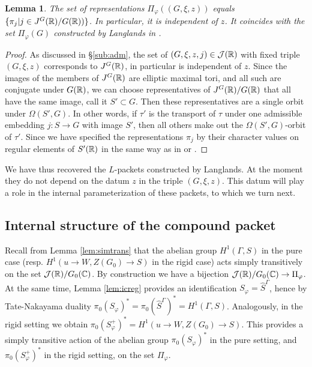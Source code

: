 \documentclass{article}
\newtheorem{lem}[thm]{Lemma}
\theoremstyle{definition}
\numberwithin{equation}{section}
\renewcommand{\-}{\hyp{}}
\begin{document}
\begin{lem}
The set of representations $\Pi_\varphi((G,\xi,z))$ equals $\{\pi_j|j \in J^G(\mathbb{R})/G(\mathbb{R}))\}$. In particular, it is independent of $z$. It coincides with the set $\Pi_\varphi(G)$ constructed by Langlands in \cite[\S3]{Lan89}.
\end{lem}
\begin{proof}
	As discussed in \S\ref{sub:adm}, the set of $(G,\xi,z,j) \in \mathcal{J}(\mathbb{R})$ with fixed triple $(G,\xi,z)$ corresponds to $J^G(\mathbb{R})$, in particular is independent of $z$. Since the images of the members of $J^G(\mathbb{R})$ are elliptic maximal tori, and all such are conjugate under $G(\mathbb{R})$, we can choose representatives of $J^G(\mathbb{R})/G(\mathbb{R})$ that all have the same image, call it $S' \subset G$. Then these representatives are a single orbit under $\Omega(S',G)$. In other words, if $\tau'$ is the transport of $\tau$ under one admissible embedding $j : S \to G$ with image $S'$, then all others make out the $\Omega(S',G)$-orbit of $\tau'$. Since we have specified the representations $\pi_j$ by their character values on regular elements of $S'(\mathbb{R})$ in the same way as in \cite[\S3]{Lan89} or \cite[\S4]{AV16}.
\end{proof}

We have thus recovered the $L$\-packets constructed by Langlands. At the moment they do not depend on the datum $z$ in the triple $(G,\xi,z)$. This datum will play a role in the internal parameterization of these packets, to which we turn next.

\subsection{Internal structure of the compound packet} \label{sub:intstr}


Recall from Lemma \ref{lem:simtrans} that the abelian group $H^1(\Gamma,S)$ in the pure case (resp. $H^1(u \to W,Z(G_0) \to S)$ in the rigid case) acts simply transitively on the set $\mathcal{J}(\mathbb{R})/G_0(\mathbb{C})$. By construction we have a bijection $\mathcal{J}(\mathbb{R})/G_0(\mathbb{C}) \to \Pi_\varphi$. At the same time, Lemma \ref{lem:icreg} provides an identification $S_\varphi = \hat S^\Gamma$, hence by Tate-Nakayama duality $\pi_0(S_\varphi)^*=\pi_0(\hat S^\Gamma)^*=H^1(\Gamma,S)$. Analogously, in the rigid setting we obtain $\pi_0(S_\varphi^+)^*=H^1(u \to W,Z(G_0) \to S)$. This provides a simply transitive action of the abelian group $\pi_0(S_\varphi)^*$ in the pure setting, and $\pi_0(S_\varphi^+)^*$ in the rigid setting, on the set $\Pi_\varphi$.
\end{document}
